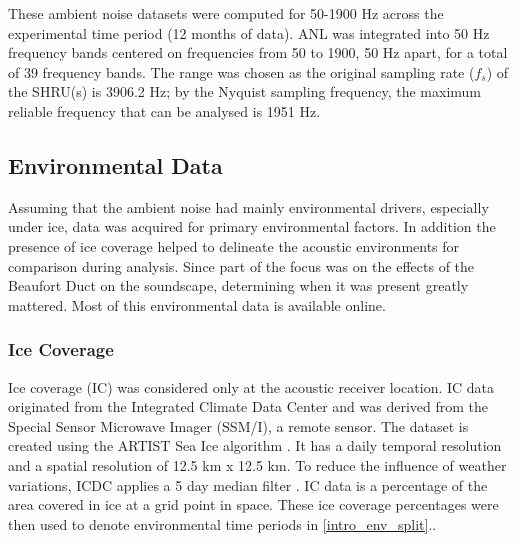 
These ambient noise datasets were computed for 50-1900 Hz across the experimental time period (12 months of data). ANL was integrated into 50 Hz frequency bands centered on frequencies from 50 to 1900, 50 Hz apart, for a total of 39 frequency bands. The range was chosen as the original sampling rate ($f_{s}$) of the SHRU(s) is  3906.2 Hz; by the Nyquist sampling frequency, the maximum reliable frequency that can be analysed is 1951 Hz.

\subsection{Environmental Data} \label{intro_env_info}

Assuming that the ambient noise had mainly environmental drivers, especially under ice, data was acquired for primary environmental factors. In addition the presence of ice coverage helped to delineate the acoustic environments for comparison during analysis. Since part of the focus was on the effects of the Beaufort Duct on the soundscape, determining when it was present greatly mattered. Most of this environmental data is available online.

\subsubsection{Ice Coverage} \label{intro_env_ice_cov}

Ice coverage (IC) was considered only at the acoustic receiver location. IC data originated from the Integrated Climate Data Center \parencite{kaleschke2001ssm} and was derived from the Special Sensor Microwave Imager (SSM/I), a remote sensor. The dataset is created using the ARTIST Sea Ice algorithm \parencite{spreen2008sea}. It has a daily temporal resolution and a spatial resolution of 12.5 km x 12.5 km. To reduce the influence of weather variations, ICDC applies a 5 day median filter \parencite{kern2010climatology}. IC data is a percentage of the area covered in ice at a grid point in space. These ice coverage percentages were then used to denote environmental time periods in \autoref{intro_env_split}..


